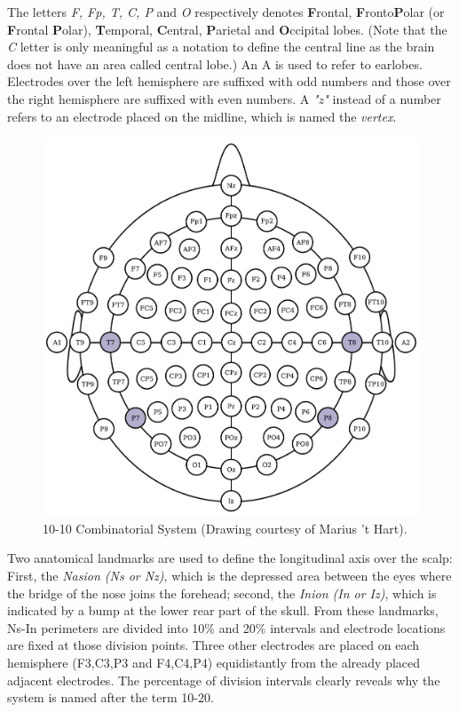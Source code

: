 \documentclass[12pt]{article}
\numberwithin{equation}{section}
\numberwithin{figure}{section}
\numberwithin{table}{section}
\begin{document}
\par{
    The letters \emph{F, Fp, T, C, P} and \emph{O} respectively denotes \textbf{F}rontal, \textbf{F}ronto\textbf{P}olar
    (or \textbf{F}rontal \textbf{P}olar), \textbf{T}emporal, \textbf{C}entral, \textbf{P}arietal and
    \textbf{O}ccipital lobes. (Note that the \emph{C} letter is only meaningful as a notation to define the central line
    as the brain does not have an area called central lobe.) An A is used to refer to earlobes.
    Electrodes over the left hemisphere are suffixed with odd numbers and those over the right hemisphere
    are suffixed with even numbers. A \emph{"z"} instead of a number refers to an electrode placed on the midline, which
    is named the \emph{vertex}.

    \begin{figure}[ht]
        \centering
        \includegraphics[scale=0.6]{images/10_20_extended}
        \caption[10-10 Combinatorial System.]{10-10 Combinatorial System (Drawing courtesy of Marius 't Hart).}
        \label{fig:eeg_1020_comb}
    \end{figure}
}

\par{
    Two anatomical landmarks are used to define the longitudinal axis over the scalp: First, the \emph{Nasion (Ns or Nz)}, which is the
    depressed area between the eyes where the bridge of the nose joins the forehead; second, the \emph{Inion (In or Iz)}, which is
    indicated by a bump at the lower rear part of the skull. From these landmarks, Ns-In perimeters are divided into 10\% and 20\% intervals
    and electrode locations are fixed at those division points. Three other electrodes are placed on each hemisphere
    (F3,C3,P3 and F4,C4,P4) equidistantly from the already placed adjacent electrodes. The percentage of division intervals
    clearly reveals why the system is named after the term 10-20.
}
\end{document}
